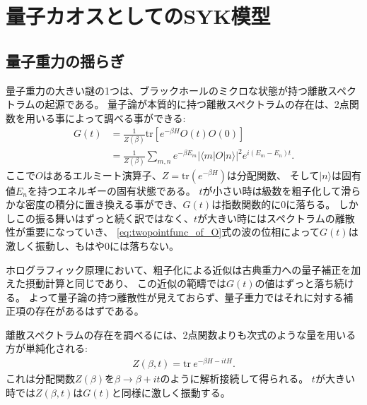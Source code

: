 \section{量子カオスとしてのSYK模型}

\subsection{量子重力の揺らぎ}
量子重力の大きい謎の1つは、ブラックホールのミクロな状態が持つ離散スペクトラムの起源である。
量子論が本質的に持つ離散スペクトラムの存在は、2点関数を用いる事によって調べる事ができる:
\begin{align}
	G(t)
		&= \frac{1}{Z(\beta)}\mathrm{tr}\left[e^{-\beta H}O(t)O(0)\right]\nonumber\\
		&= \frac{1}{Z(\beta)}\sum_{m, n}e^{-\beta E_m}
			|\langle m|O|n \rangle|^2e^{i(E_m - E_n)t}.
	\label{eq:twopointfunc_of_O}
\end{align}
ここで$O$はあるエルミート演算子、$Z = \mathrm{tr}(e^{-\beta H})$は分配関数、
そして$|n\rangle$は固有値$E_n$を持つエネルギーの固有状態である。
$t$が小さい時は級数を粗子化して滑らかな密度の積分に置き換える事ができ、$G(t)$は指数関数的に0に落ちる。
しかしこの振る舞いはずっと続く訳ではなく、$t$が大きい時にはスペクトラムの離散性が重要になっていき、
\eqref{eq:twopointfunc_of_O}式の波の位相によって$G(t)$は激しく振動し、もはや0には落ちない。

ホログラフィック原理において、粗子化による近似は古典重力への量子補正を加えた摂動計算と同じであり、
この近似の範疇では$G(t)$の値はずっと落ち続ける。
よって量子論の持つ離散性が見えておらず、量子重力ではそれに対する補正項の存在があるはずである。

離散スペクトラムの存在を調べるには、2点関数よりも次式のような量を用いる方が単純化される:
\begin{align}
	Z(\beta, t) = \mathrm{tr}\ e^{-\beta H - itH}.
\end{align}
これは分配関数$Z(\beta)$を$\beta\to\beta + it$のように解析接続して得られる。
$t$が大きい時では$Z(\beta, t)$は$G(t)$と同様に激しく振動する。

